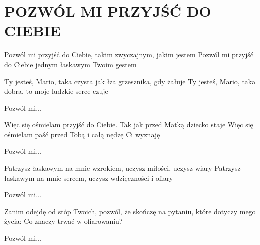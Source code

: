 \documentclass[../../../songbook.tex]{subfiles}
\begin{document}
\TabPositions{8cm} %
\section*{POZWÓL MI PRZYJŚĆ DO CIEBIE}
{}
\vspace{0.5cm}
\-\hspace{1cm} Pozwól mi przyjść do Ciebie,	 \newline
\-\hspace{1cm} takim zwyczajnym, jakim jestem	 \newline
\-\hspace{1cm} Pozwól mi przyjść do Ciebie		 \newline
\-\hspace{1cm} jednym łaskawym Twoim gestem	 \newline

Ty jesteś, Mario, taka czysta \newline
jak łza grzesznika, gdy żałuje \newline
Ty jesteś, Mario, taka dobra, \newline
to moje ludzkie serce czuje \newline

\-\hspace{1cm} Pozwól mi... \newline

Więc się ośmielam przyjść do Ciebie. \newline
Tak jak przed Matką dziecko staje \newline
Więc się ośmielam paść przed Tobą \newline
i całą nędzę Ci wyznaję

\-\hspace{1cm} Pozwól mi... \newline

Patrzysz łaskawym na mnie wzrokiem, \newline
uczysz miłości, uczysz wiary \newline
Patrzysz łaskawym na mnie sercem, \newline
uczysz wdzięczności i ofiary \newline

\-\hspace{1cm} Pozwól mi... \newline

Zanim odejdę od stóp Twoich, \newline
pozwól, że skończę na pytaniu, \newline
które dotyczy mego życia: \newline
Co znaczy trwać w ofiarowaniu? \newline

\-\hspace{1cm} Pozwól mi... \newline
\end{document}
